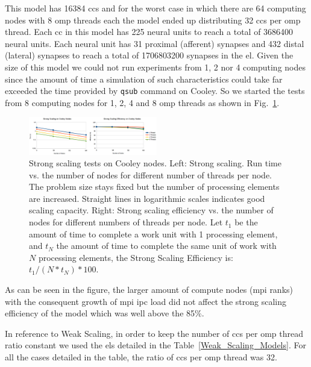 \documentclass[10pt,journal,compsoc]{IEEEtran}
\begin{document}
This model has 16384 \glspl{cc} and for the worst case in which there are 64 computing nodes with 8 \gls{omp} threads each the model ended up distributing 32 \glspl{cc} per \gls{omp} thread. Each \gls{cc} in this model has 225 neural units to reach a total of 3686400 neural units. Each neural unit has 31 proximal (afferent) synapses and 432 distal (lateral) synapses to reach a total of 1706803200 synapses in the \gls{el}. Given the size of this model we could not run experiments from 1, 2 nor 4 computing nodes since the amount of time a simulation of such characteristics could take far exceeded the time provided by \texttt{qsub} command on Cooley. So we started the tests from 8 computing nodes for 1, 2, 4 and 8 \gls{omp} threads as shown in Fig.~\ref{fig:Strong_Scaling1}.

\begin{figure}[h!]
    \centering
    \includegraphics[width=0.5\textwidth]{Strong_Scaling1.png}
    \caption{Strong scaling tests on Cooley nodes. Left: Strong scaling. Run time vs. the number of nodes for different number of threads per node. The problem size stays fixed but the number of processing elements are increased. Straight lines in logarithmic scales indicates good scaling capacity. Right: Strong scaling efficiency vs. the number of nodes for different numbers of threads per node. Let $t_1$ be the amount of time to complete a work unit with 1 processing element, and $t_N$ the amount of time to complete the same unit of work with $N$ processing elements, the Strong Scaling Efficiency is: $t_1 / (N * t_N) * 100$.}
    \label{fig:Strong_Scaling1}
\end{figure}

As can be seen in the figure, the larger amount of compute nodes (\gls{mpi} ranks) with the consequent growth of \gls{mpi} \gls{ipc} load did not affect the strong scaling efficiency of the model which was well above the 85\%.

In reference to Weak Scaling, in order to keep the number of \glspl{cc} per \gls{omp} thread ratio constant we used the \glspl{el} detailed in the Table~\ref{Weak_Scaling_Models}. For all the cases detailed in the table, the ratio of \glspl{cc} per \gls{omp} thread was 32.
\end{document}
